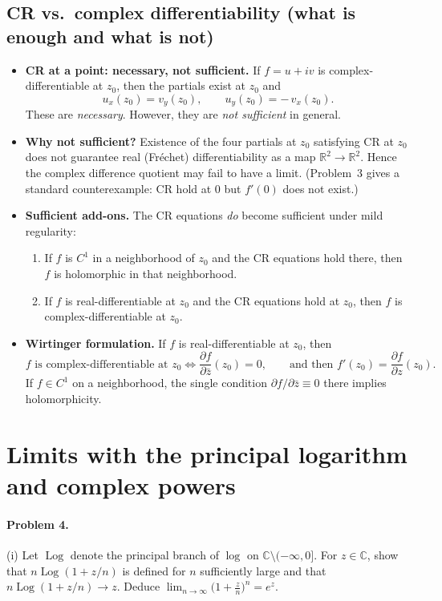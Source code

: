 \documentclass[11pt,a4paper]{article}
\theoremstyle{definition}
\theoremstyle{definition}
\theoremstyle{plain}
\theoremstyle{remark}
\DeclareMathOperator{\Log}{Log}
\begin{document}
\subsection*{CR vs.\ complex differentiability (what is enough and what is not)}

\begin{itemize}
	\item \textbf{CR at a point: necessary, not sufficient.}
	If $f=u+iv$ is complex-differentiable at $z_0$, then the partials exist at $z_0$ and
	\[
	u_x(z_0)=v_y(z_0),\qquad u_y(z_0)=-\,v_x(z_0).
	\]
	These are \emph{necessary}. However, they are \emph{not sufficient} in general.
	
	\item \textbf{Why not sufficient?}
	Existence of the four partials at $z_0$ satisfying CR at $z_0$ does not guarantee real (Fr\'echet)
	differentiability as a map $\mathbb{R}^2\!\to\!\mathbb{R}^2$. Hence the complex difference quotient
	may fail to have a limit. (Problem~3 gives a standard counterexample: CR hold at $0$ but $f'(0)$ does not exist.)
	
	\item \textbf{Sufficient add-ons.} The CR equations \emph{do} become sufficient under mild regularity:
	\begin{enumerate}
		\item If $f$ is $C^1$ in a neighborhood of $z_0$ and the CR equations hold there, then $f$ is holomorphic
		in that neighborhood.
		\item If $f$ is real-differentiable at $z_0$ and the CR equations hold at $z_0$, then $f$ is complex-differentiable at $z_0$.
	\end{enumerate}
	
	\item \textbf{Wirtinger formulation.}
	If $f$ is real-differentiable at $z_0$, then
	\[
	f \text{ is complex-differentiable at } z_0
	\iff \frac{\partial f}{\partial \bar z}(z_0)=0,
	\qquad \text{and then } f'(z_0)=\frac{\partial f}{\partial z}(z_0).
	\]
	If $f\in C^1$ on a neighborhood, the single condition $\partial f/\partial \bar z\equiv0$ there implies holomorphicity.
\end{itemize}

\section*{Limits with the principal logarithm and complex powers}

\paragraph{Problem 4.}
(i) Let $\Log$ denote the principal branch of $\log$ on $\mathbb C\setminus(-\infty,0]$.
For $z\in\mathbb C$, show that $n\Log(1+z/n)$ is defined for $n$ sufficiently large and that
$n\Log(1+z/n)\to z$. Deduce $\displaystyle\lim_{n\to\infty}\bigl(1+\frac{z}{n}\bigr)^n=e^{z}$.
\smallskip
\end{document}
